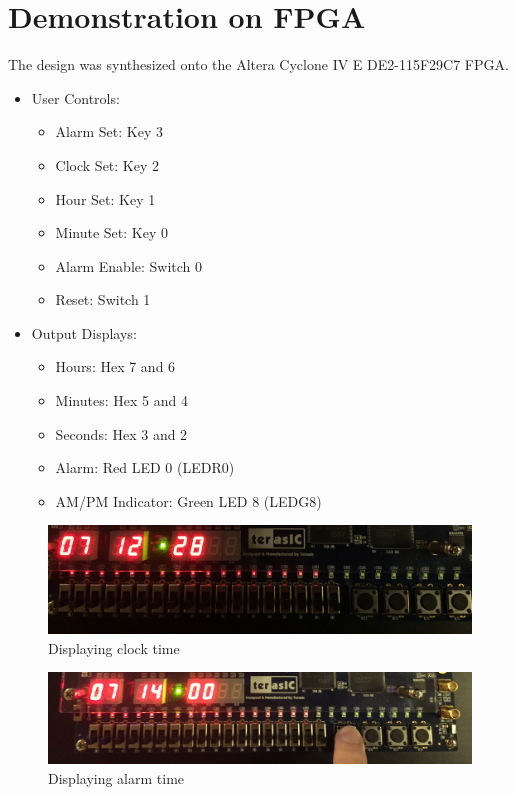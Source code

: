 \documentclass[12pt]{article}
\begin{document}
\section{Demonstration on FPGA} \label{demo}
The design was synthesized onto the Altera Cyclone IV E DE2-115F29C7 FPGA.
\begin{itemize}
\item User Controls:
	\begin{itemize}
	\item Alarm Set: Key 3
	\item Clock Set: Key 2
	\item Hour Set: Key 1
	\item Minute Set: Key 0
	\item Alarm Enable: Switch 0
	\item Reset: Switch 1
	\end{itemize}
\item Output Displays:
	\begin{itemize}
	\item Hours: Hex 7 and 6
	\item Minutes: Hex 5 and 4
	\item Seconds: Hex 3 and 2
	\item Alarm: Red LED 0 (LEDR0)
	\item AM/PM Indicator: Green LED 8 (LEDG8)
	\end{itemize}
\end{itemize}

\begin{figure}[H]
\begin{center}
\includegraphics[scale=0.1]{board_1.png}
\caption{Displaying clock time}
\label{fig:board1}
\end{center}
\end{figure}

\begin{figure}[H]
\begin{center}
\includegraphics[scale=0.1]{board_2.png}
\caption{Displaying alarm time}
\label{fig:board2}
\end{center}
\end{figure}
\end{document}
